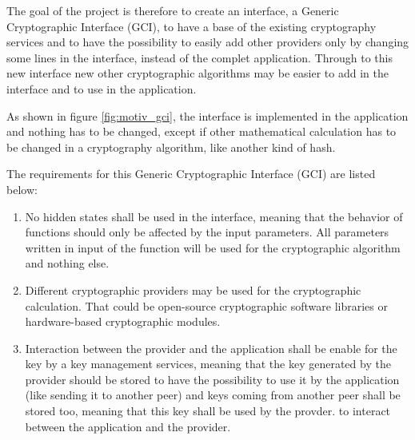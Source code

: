 The goal of the project is therefore to create an interface, a Generic
Cryptographic Interface (GCI), to have a base of the existing cryptography
services and to have the possibility to easily add other providers only by
changing some lines in the interface, instead of the complet
application.\newline
Through to this new interface new other cryptographic algorithms may be
easier to add in the interface and to use in the application.\newline

As shown in figure \ref{fig:motiv_gci}, the interface is implemented in the
application and nothing has to be changed, except if other mathematical
calculation has to be changed in a cryptography algorithm, like another
kind of hash.\newline


The requirements for this Generic Cryptographic Interface (GCI) are listed
below:
\begin{enumerate}
  \item No hidden states shall be used in the interface, meaning that the
  behavior of functions should only be affected by the input parameters.\newline
  All parameters written in input of the function will be used for the
  cryptographic algorithm and nothing else.
  \item Different cryptographic providers may be used for the cryptographic
  calculation. \newline
  That could be open-source cryptographic software libraries or hardware-based cryptographic modules.
  \item Interaction between the provider and the application shall be
  enable for the key by a  key management services, meaning that the key
  generated by the provider should be stored to have the possibility to use it
  by the application (like sending it to another peer) and keys coming from
  another peer shall be stored too, meaning that this key shall be used by the provder.
  \newline to interact between the application and
  the provider.
\end{enumerate}

 


